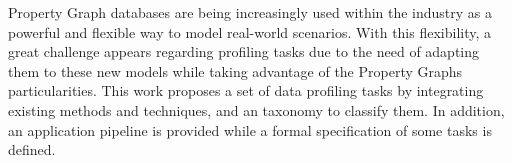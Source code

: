 \begin{foreignabstract}

 Property Graph databases are being increasingly used within the industry as a powerful and flexible way to model real-world scenarios. With this flexibility, a great challenge appears regarding profiling tasks due to the need of adapting them to these new models while taking advantage of the Property Graphs particularities. This work proposes a set of data profiling tasks by integrating existing methods and techniques, and an taxonomy to classify them. In addition, an application pipeline is provided while a formal specification of some tasks is defined.
\end{foreignabstract}